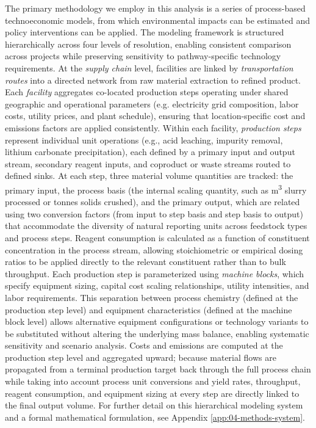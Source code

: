 The primary methodology we employ in this analysis is a series of process-based technoeconomic models, from which environmental impacts can be estimated and policy interventions can be applied. The modeling framework is structured hierarchically across four levels of resolution, enabling consistent comparison across projects while preserving sensitivity to pathway-specific technology requirements. At the \textit{supply chain} level, facilities are linked by \textit{transportation routes} into a directed network from raw material extraction to refined  product. Each \textit{facility} aggregates co-located production steps operating under shared geographic and operational parameters (e.g. electricity grid composition, labor costs, utility prices, and plant schedule), ensuring that location-specific cost and emissions factors are applied consistently. Within each facility, \textit{production steps} represent individual unit operations (e.g., acid leaching, impurity removal, lithium carbonate precipitation), each defined by a primary input and output stream, secondary reagent inputs, and coproduct or waste streams routed to defined sinks. At each step, three material volume quantities are tracked: the primary input, the process basis (the internal scaling quantity, such as \si{m^3} slurry processed or tonnes solids crushed), and the primary output, which are related using two conversion factors (from input to step basis and step basis to output) that accommodate the diversity of natural reporting units across feedstock types and process steps. Reagent consumption is calculated as a function of constituent concentration in the process stream, allowing stoichiometric or empirical dosing ratios to be applied directly to the relevant constituent rather than to bulk throughput. Each production step is parameterized using \textit{machine blocks}, which specify equipment sizing, capital cost scaling relationships, utility intensities, and labor requirements. This separation between process chemistry (defined at the production step level) and equipment characteristics (defined at the machine block level) allows alternative equipment configurations or technology variants to be substituted without altering the underlying mass balance, enabling systematic sensitivity and scenario analysis. Costs and emissions are computed at the production step level and aggregated upward; because material flows are propagated from a terminal production target back through the full process chain while taking into account process unit conversions and yield rates, throughput, reagent consumption, and equipment sizing at every step are directly linked to the final output volume. For further detail on this hierarchical modeling system and a formal mathematical formulation, see Appendix \ref{app:04-methods-system}. 

